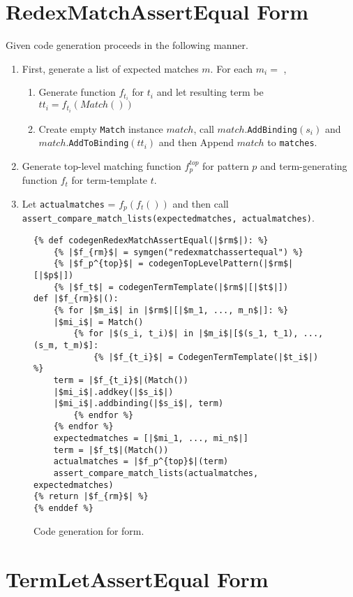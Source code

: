 \section{RedexMatchAssertEqual Form}
Given \RedexMatchAssertEqual code generation proceeds in the following manner.

\begin{enumerate}
\item First, generate a list of expected matches $m$. For each $m_i =$ \Match,
\begin{enumerate}
\item Generate function $f_{t_i}$ for $t_i$ and let resulting term be $tt_i = f_{t_i}(Match())$
\item Create empty \texttt{Match} instance $match$, call $match$.\texttt{AddBinding}$(s_i)$ and $match$.\texttt{AddToBinding}$(tt_i)$ and then Append $match$ to \texttt{matches}.
\end{enumerate}
\item Generate top-level matching function $f_p^{top}$ for pattern $p$ and term-generating function $f_t$ for term-template $t$.
\item Let \texttt{actualmatches} = $f_p(f_t())$ and then call \texttt{assert\_compare\_match\_lists(expectedmatches, actualmatches)}.
\end{enumerate}

\begin{figure}[h]
\begin{verbatim}
{% def codegenRedexMatchAssertEqual(|$rm$|): %}
	{% |$f_{rm}$| = symgen("redexmatchassertequal") %}
	{% |$f_p^{top}$| = codegenTopLevelPattern(|$rm$|[|$p$|])
	{% |$f_t$| = codegenTermTemplate(|$rm$|[|$t$|])
def |$f_{rm}$|():
	{% for |$m_i$| in |$rm$|[|$m_1, ..., m_n$|]: %}
	|$mi_i$| = Match()
		{% for |$(s_i, t_i)$| in |$m_i$|[$(s_1, t_1), ..., (s_m, t_m)$]:
			{% |$f_{t_i}$| = CodegenTermTemplate(|$t_i$|) %}
	term = |$f_{t_i}$|(Match())
	|$mi_i$|.addkey(|$s_i$|)
	|$mi_i$|.addbinding(|$s_i$|, term)
		{% endfor %}
	{% endfor %}
	expectedmatches = [|$mi_1, ..., mi_n$|]
	term = |$f_t$|(Match())
	actualmatches = |$f_p^{top}$|(term)
	assert_compare_match_lists(actualmatches, expectedmatches)
{% return |$f_{rm}$| %}
{% enddef %}
\end{verbatim}
\caption{Code generation for \RedexMatchAssertEqualNoArgs \space form.}
\label{codegen-redexmatch}
\end{figure}

\section{TermLetAssertEqual Form}

